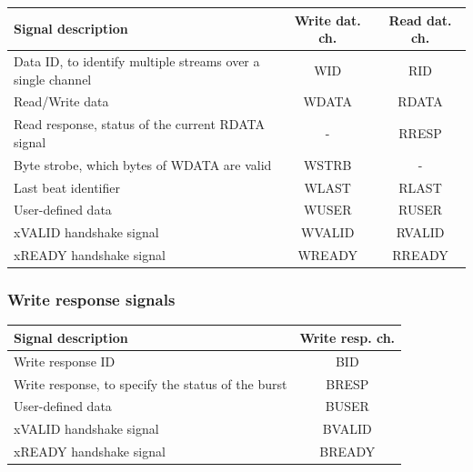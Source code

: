 \documentclass[a4paper]{scrartcl}
\begin{document}
        \begin{longtable}[c]{| l | c | c |} 
            \hline
            Signal description &
            Write dat. ch. &
            Read dat. ch. \\ \hline \hline
            Data ID, to identify multiple streams over a
            single channel &
            WID &
            RID \\ \hline
            Read/Write data &
            WDATA &
            RDATA \\ \hline
            Read response, status of the current RDATA signal &
            - &
            RRESP \\ \hline
            Byte strobe, which bytes of WDATA are valid  &
            WSTRB &
            - \\ \hline
            Last beat identifier &
            WLAST &
            RLAST \\ \hline
            User-defined data &
            WUSER &
            RUSER \\ \hline
            xVALID handshake signal &
            WVALID &
            RVALID \\ \hline
            xREADY handshake signal &
            WREADY &
            RREADY \\ \hline
        \end{longtable}
        \subsubsection*{Write response signals}
        \begin{longtable}[c]{| l | c |}
            \hline
            Signal description &
            Write resp. ch. \\ \hline
            Write response ID &
            BID \\ \hline
            Write response, to specify the status of the burst &
            BRESP \\ \hline
            User-defined data &
            BUSER \\ \hline
            xVALID handshake signal &
            BVALID \\ \hline
            xREADY handshake signal &
            BREADY \\ \hline
        \end{longtable} 
\end{document}
